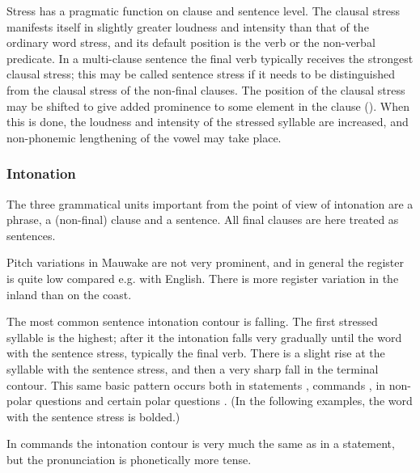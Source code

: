 Stress has a pragmatic function on clause and sentence level. The clausal stress manifests itself in slightly greater loudness and intensity than that of the ordinary word stress, and its default position is the verb or the non-verbal predicate. In a multi-clause sentence the final verb typically receives the strongest clausal stress; this may be called sentence stress if it needs to be distinguished from the clausal stress of the non-final clauses. The position of the clausal stress may be shifted to give added prominence to some element in the clause (). When this is done, the loudness and intensity of the stressed syllable are increased, and non-phonemic lengthening of the vowel may take place.

\subsubsection{Intonation}


The three grammatical units important from the point of view of intonation are a phrase, a (non-final) clause and a sentence. All final clauses are here treated as sentences.

Pitch variations in Mauwake are not very prominent, and in general the register is quite low compared e.g. with English. There is more register variation in the inland than on the coast. 

The most common sentence intonation contour is falling. The first stressed syllable is the highest; after it the intonation falls very gradually until the word with the sentence stress, typically the final verb. There is a slight rise at the syllable with the sentence stress, and then a very sharp fall in the terminal contour.  This same basic pattern occurs both in statements , commands , in non-polar questions  and certain polar questions . (In the following examples, the word with the sentence stress is bolded.)




In commands the intonation contour is very much the same as in a statement, but the pronunciation is phonetically more tense.


